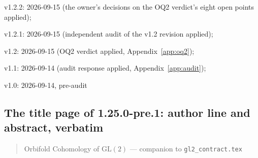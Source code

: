 \documentclass[11pt]{article}
\theoremstyle{remark}
\newcommand{\GL}{\mathrm{GL}}
\begin{document}
v1.2.2: 2026-09-15 (the owner's decisions on the OQ2 verdict's eight open points applied);

v1.2.1: 2026-09-15 (independent audit of the v1.2 revision applied);

v1.2: 2026-09-15 (OQ2 verdict applied, Appendix~\ref{app:oq2});

v1.1: 2026-09-14 (audit response applied, Appendix~\ref{app:audit});

v1.0: 2026-09-14, pre-audit

\subsection{The title page of 1.25.0-pre.1: author line and abstract, verbatim}
\begin{quote}
Orbifold Cohomology of $\GL(2)$ --- companion to \texttt{gl2\_contract.tex}
\end{quote}
\end{document}
